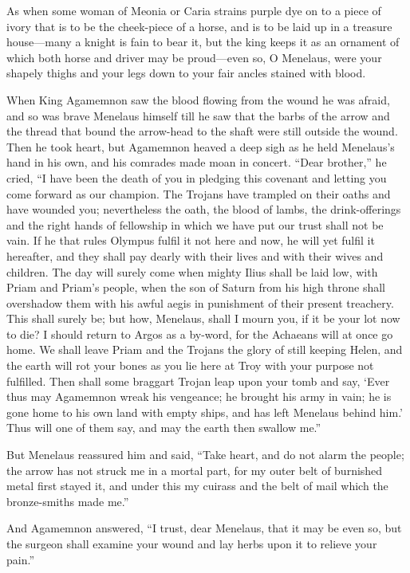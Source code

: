 As when some woman of Meonia or Caria strains purple dye on to a piece of
ivory that is to be the cheek-piece of a horse, and is to be laid up in a
treasure house—many a knight is fain to bear it, but the king keeps
it as an ornament of which both horse and driver may be proud—even
so, O Menelaus, were your shapely thighs and your legs down to your fair
ancles stained with blood.

When King Agamemnon saw the blood flowing from the wound he was afraid,
and so was brave Menelaus himself till he saw that the barbs of the arrow
and the thread that bound the arrow-head to the shaft were still outside
the wound. Then he took heart, but Agamemnon heaved a deep sigh as he held
Menelaus’s hand in his own, and his comrades made moan in concert. “Dear
brother,” he cried, “I have been the death of you in pledging this
covenant and letting you come forward as our champion. The Trojans have
trampled on their oaths and have wounded you; nevertheless the oath, the
blood of lambs, the drink-offerings and the right hands of fellowship in
which we have put our trust shall not be vain. If he that rules Olympus
fulfil it not here and now, he will yet fulfil it hereafter, and they
shall pay dearly with their lives and with their wives and children. The
day will surely come when mighty Ilius shall be laid low, with Priam and
Priam’s people, when the son of Saturn from his high throne shall
overshadow them with his awful aegis in punishment of their present
treachery. This shall surely be; but how, Menelaus, shall I mourn you, if
it be your lot now to die? I should return to Argos as a by-word, for the
Achaeans will at once go home. We shall leave Priam and the Trojans the
glory of still keeping Helen, and the earth will rot your bones as you lie
here at Troy with your purpose not fulfilled. Then shall some braggart
Trojan leap upon your tomb and say, ‘Ever thus may Agamemnon wreak his
vengeance; he brought his army in vain; he is gone home to his own land
with empty ships, and has left Menelaus behind him.’ Thus will one of them
say, and may the earth then swallow me.”

But Menelaus reassured him and said, “Take heart, and do not alarm the
people; the arrow has not struck me in a mortal part, for my outer belt of
burnished metal first stayed it, and under this my cuirass and the belt of
mail which the bronze-smiths made me.”

And Agamemnon answered, “I trust, dear Menelaus, that it may be even so,
but the surgeon shall examine your wound and lay herbs upon it to relieve
your pain.”

